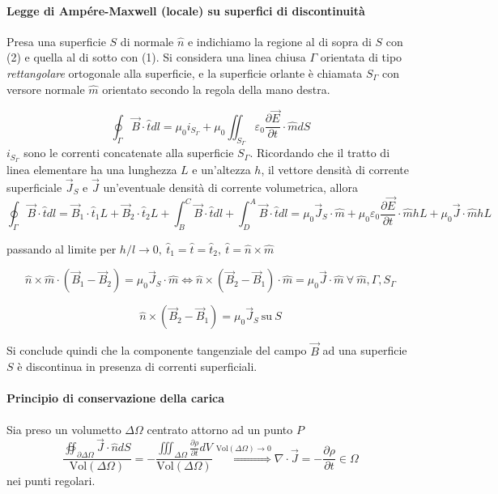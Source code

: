 
\paragraph{Legge di Ampére-Maxwell (locale) su superfici di discontinuità}
Presa una superficie $S$ di normale $\hat{n}$ e indichiamo la regione al di sopra di $S$ con
(2) e quella al di sotto con (1).
Si considera una linea chiusa $\Gamma$ orientata di tipo \textit{rettangolare} ortogonale alla
superficie, e la superficie orlante è chiamata $S_\Gamma$ con versore normale $\hat{m}$ orientato 
secondo la regola della mano destra.

$$
\oint_\Gamma \vec{B}\cdot\hat{t} dl = \mu_0 i_{S_\Gamma} + \mu_0 \iint_{S_\Gamma} \varepsilon_0 \frac{\partial\vec{E}}{\partial t}\cdot\hat{m}dS 
$$
$i_{S_\Gamma}$ sono le correnti concatenate alla superficie $S_\Gamma$.
Ricordando che il tratto di linea elementare ha una lunghezza $L$ e un'altezza $h$, 
il vettore densità di corrente superficiale $\vec{J}_S$ e $\vec{J}$ un'eventuale
densità di corrente volumetrica, allora
$$
\oint_\Gamma\vec{B}\cdot\hat{t}dl = \vec{B}_1\cdot\hat{t}_1L + \vec{B}_2\cdot\hat{t}_2L +
\int_B^C\vec{B}\cdot\hat{t}dl + \int_D^A\vec{B}\cdot\hat{t}dl = \mu_0\vec{J}_S\cdot\hat{m} + 
\mu_0\varepsilon_0\frac{\partial\vec{E}}{\partial t}\cdot\hat{m}hL + \mu_0 \vec{J}\cdot\hat{m}hL
$$

passando al limite per $h/l \to 0,\ \hat{t}_1 = \hat{t} = \hat{t}_2,\ \hat{t} = \hat{n}\times\hat{m}$

$$
\hat{n}\times\hat{m}\cdot(\vec{B}_1-\vec{B}_2) = \mu_0 \vec{J}_S \cdot \hat{m} \Leftrightarrow 
\hat{n}\times(\vec{B}_2-\vec{B}_1)\cdot\hat{m} = \mu_0 \vec{J}\cdot\hat{m}\ 
\forall\ \hat{m},\Gamma,S_\Gamma
$$

$$
\hat{n}\times(\vec{B}_2-\vec{B}_1) = \mu_0\vec{J}_S\ \text{su} \ S
$$

Si conclude quindi che la componente tangenziale del campo $\vec{B}$ ad una superficie $S$ è discontinua
in presenza di correnti superficiali.

\paragraph{Principio di conservazione della carica}
Sia preso un volumetto $\Delta\Omega$ centrato attorno ad un punto $P$
$$
\frac{\oiint_{\partial\Delta\Omega} \vec{J}\cdot\hat{n} dS}{\text{Vol}(\Delta\Omega)} = -\frac{ \iiint_{\Delta\Omega} \frac{\partial\rho}{\partial t} dV}{\text{Vol}(\Delta\Omega)} \stackrel{\text{Vol}(\Delta\Omega)\to 0} {\Rightarrow}
\nabla\cdot\vec{J} = -\frac{\partial\rho}{\partial t} \in \Omega
$$
nei punti regolari.

